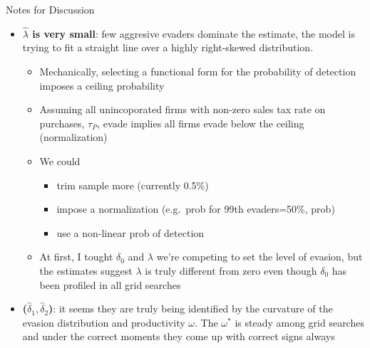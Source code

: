 \documentclass[
  ignorenonframetext,
  aspectratio=169,
]{beamer}
\providecommand{\tightlist}{%
  \setlength{\itemsep}{0pt}\setlength{\parskip}{0pt}}
\begin{document}
\begin{frame}{Notes for Discussion}
\protect{}\label{notes-for-discussion}
\begin{itemize}
\tightlist
\item
  \textbf{\(\hat\lambda\) is very small}: few aggresive evaders dominate
  the estimate, the model is trying to fit a straight line over a highly
  right-skewed distribution.

  \begin{itemize}
  \tightlist
  \item
    Mechanically, selecting a functional form for the probability of
    detection imposes a ceiling probability
  \item
    Assuming all unincoporated firms with non-zero sales tax rate on
    purchases, \(\tau_P\), evade implies all firms evade below the
    ceiling (normalization)
  \item
    We could

    \begin{itemize}
    \tightlist
    \item
      trim sample more (currently 0.5\%)
    \item
      impose a normalization (e.g.~prob for 99th evaders=50\%, prob)
    \item
      use a non-linear prob of detection
    \end{itemize}
  \item
    At first, I tought \(\delta_0\) and \(\lambda\) we're competing to
    set the level of evasion, but the estimates suggest \(\lambda\) is
    truly different from zero even though \(\delta_0\) has been profiled
    in all grid searches
  \end{itemize}
\item
  \textbf{(\(\hat\delta_1, \hat\delta_2\))}: it seems they are truly
  being identified by the curvature of the evasion distribution and
  productivity \(\omega\). The \(\omega^*\) is steady among grid
  searches and under the correct moments they come up with correct signs
  always
\end{itemize}
\end{frame}
\end{document}

